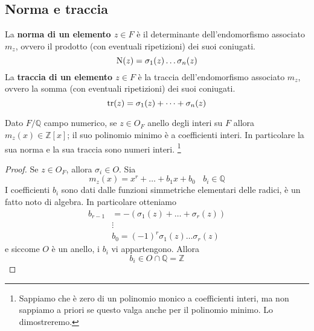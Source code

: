\subsection{Norma e traccia}
\begin{definizione}
	La \textbf{norma di un elemento $z\in F$} è il determinante dell'endomorfismo associato $m_z$, ovvero il prodotto (con eventuali ripetizioni) dei suoi coniugati. 
	\begin{equation*}
	\operatorname{N}(z)=\sigma_1(z)\dots\sigma_n(z)
	\end{equation*}
	La \textbf{traccia di un elemento $z\in F$} è la traccia dell'endomorfismo associato $m_z$, ovvero la somma (con eventuali ripetizioni) dei suoi coniugati.
	\begin{equation*}
	\operatorname{tr}(z)=\sigma_1(z)+\dots+\sigma_n(z)
	\end{equation*}
\end{definizione}
\begin{proposizione}
	Dato $F/\mathbb{Q}$ campo numerico, se $z\in O_F$ anello degli interi su $F$ allora $m_z(x)\in\mathbb{Z}[x]$; il suo polinomio minimo è a coefficienti interi. In particolare la sua norma e la sua traccia sono numeri interi. \footnote{Sappiamo che è zero di un polinomio monico a coefficienti interi, ma non sappiamo a priori se questo valga anche per il polinomio minimo. Lo dimostreremo.}
\end{proposizione}
\begin{proof}
	Se $z\in O_F$, allora $\sigma_i\in O$. Sia 
	\begin{equation*}
	m_z(x)=x^r+\dots+b_1x+b_0 \ \ \ \ b_i\in\mathbb{Q}
	\end{equation*}
	I coefficienti $b_i$ sono dati dalle funzioni simmetriche elementari delle radici, è un fatto noto di algebra. In particolare otteniamo
	\begin{align*}
	b_{r-1}&=-\left(\sigma_1(z)+\dots+\sigma_r(z)\right)\\
	&\vdots\\
	&b_0=(-1)^r\sigma_1(z)\dots\sigma_r(z)
	\end{align*}
	e siccome $O$ è un anello, i $b_i$ vi appartengono. Allora 
	\begin{equation*}
	b_i\in O\cap\mathbb{Q}=\mathbb{Z}
	\end{equation*}
\end{proof}





